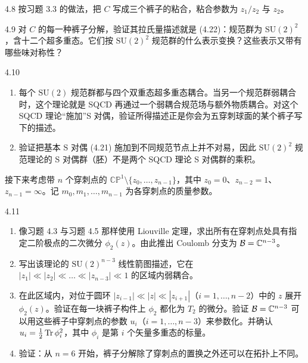 \begin{exercise}{4.8}
按习题 3.3 的做法，把 $C$ 写成三个裤子的粘合，粘合参数为 $z_1/z_2$ 与 $z_2$。
\end{exercise}

\begin{exercise}{4.9}
对 $C$ 的每一种裤子分解，验证其拉氏量描述就是 (4.22)：规范群为 $\mathrm{SU}(2)^2$，含十二个超多重态。它们按 $\mathrm{SU}(2)^2$ 规范群的什么表示变换？这些表示又带有哪些味对称性？
\end{exercise}

\begin{exercise}{4.10}
\begin{enumerate}[label=\arabic*.,leftmargin=2em,itemsep=1pt,topsep=1pt]
\item 每个 $\mathrm{SU}(2)$ 规范群都与四个双重态超多重态耦合。当另一个规范群弱耦合时，这个理论就是 SQCD 再通过一个弱耦合规范场与额外物质耦合。对这个 SQCD 理论“施加”S 对偶，验证所得描述正是你会为五穿刺球面的某个裤子写下的描述。
\item 验证把基本 S 对偶 (4.21) 施加到不同规范节点上并不对易，因此 $\mathrm{SU}(2)^2$ 规范理论的 S 对偶群（胚）不是两个 SQCD 理论 S 对偶群的乘积。
\end{enumerate}
\end{exercise}

 接下来考虑带 $n$ 个穿刺点的 $\mathbb{CP}^1\setminus\{z_0,\dots,z_{n-1}\}$，其中 $z_0=0$、$z_{n-2}=1$、$z_{n-1}=\infty$。记 $m_0,m_1,\dots,m_{n-1}$ 为各穿刺点的质量参数。

\begin{exercise}{4.11}
\begin{enumerate}[label=\arabic*.,leftmargin=2em,itemsep=1pt,topsep=1pt]
\item 像习题 4.3 与习题 4.5 那样使用 Liouville 定理，求出所有在穿刺点处具有指定二阶极点的二次微分 $\phi_2(z)$。由此推出 Coulomb 分支为 $\mathcal{B}=\mathbb{C}^{n-3}$。
\item 写出该理论的 $\mathrm{SU}(2)^{n-3}$ 线性箭图描述，它在 $|z_1|\ll|z_2|\ll\dots\ll|z_{n-3}|\ll1$ 的区域内弱耦合。
\item 在此区域内，对位于圆环 $|z_{i-1}|\ll|z|\ll|z_{i+1}|$（$i=1,\dots,n-2$）中的 $z$ 展开 $\phi_2(z)$。验证在每一块裤子构件上 $\phi_2$ 都化为 $T_2$ 的微分。验证 $\mathcal{B}=\mathbb{C}^{n-3}$ 可以用这些裤子中穿刺点的参数 $u_i$（$i=1,\dots,n-3$）来参数化。并确认 $u_i=\tfrac{1}{2}\operatorname{Tr}\phi_i^2$，其中 $\phi_i$ 是第 $i$ 个矢量多重态的标量。
\item 验证：从 $n=6$ 开始，裤子分解除了穿刺点的置换之外还可以在拓扑上不同。
\end{enumerate}
\end{exercise}

